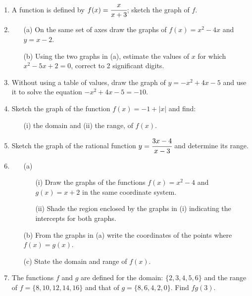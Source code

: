 \begin{enumerate}
	\item A function is defined by $f(x) = \cfrac{x}{x + 3}$; sketch the graph of $f$.
	
	\item 
		\begin{itemize}
		\item[(a)] On the same set of axes draw the graphs of $f(x) = x^2 - 4x$ and $y = x - 2$.
		\item[(b)] Using the two graphs in (a), estimate the values of $x$ for which $x^2 - 5x + 2 = 0$, correct to 2 significant digits.
		\end{itemize}
		
		\item Without using a table of values, draw the graph of $y = -x^2 + 4x - 5$ and use it to solve the equation $-x^2 + 4x - 5 = -10$.
		
		\item Sketch the graph of the function $f(x) = -1 + |x|$ and find:
			\begin{itemize}
			\item[(i)] the domain and \quad (ii) the range, of $f(x)$.
			\end{itemize}
			
	\item Sketch the graph of the rational function $y = \cfrac{3x - 4}{x - 3}$ and determine its range.
	
	\item 
		\begin{itemize}
		\item[(a)] 
			\begin{itemize}
			\item[(i)] Draw the graphs of the functions $f(x) = x^2 - 4$ and $g(x) = x + 2$ in the same coordinate system.
			\item[(ii)] Shade the region enclosed by the graphs in (i) indicating the intercepts for both graphs.
			\end{itemize}
		\item[(b)] From the graphs in (a) write the coordinates of the points where $f(x) = g(x)$.
		\item[(c)] State the domain and range of $f(x)$.
		\end{itemize}
		
	\item The functions $f$ and $g$ are defined for the domain: $\{2, 3, 4, 5, 6\}$ and the range of $f = \{8, 10, 12, 14, 16\}$ and that of $g = \{8, 6, 4, 2, 0\}$. Find $fg(3)$.
	

\end{enumerate}

